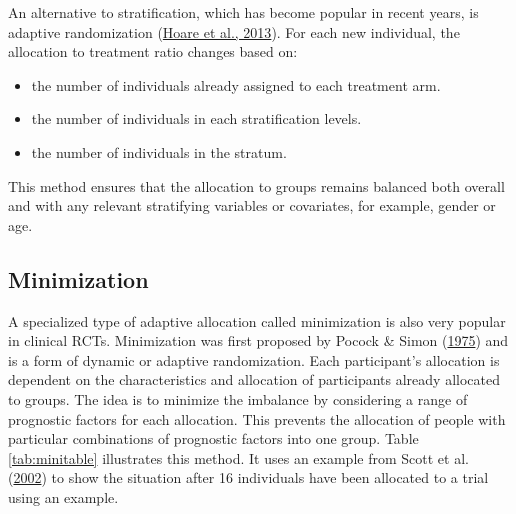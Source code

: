 \documentclass{krantz}
\providecommand{\tightlist}{%
\setlength{\itemsep}{0pt}\setlength{\parskip}{0pt}}
\begin{document}
An alternative to stratification, which has become popular in recent years, is adaptive randomization (\protect\hyperlink{ref-hoare2013}{Hoare et al., 2013}). For each new individual, the allocation to treatment ratio changes based on:

\begin{itemize}
\tightlist
\item
  the number of individuals already assigned to each treatment arm.
\item
  the number of individuals in each stratification levels.
\item
  the number of individuals in the stratum.
\end{itemize}

This method ensures that the allocation to groups remains balanced both overall and with any relevant stratifying variables or covariates, for example, gender or age.

\hypertarget{minimization}{%
\subsection{Minimization}\label{minimization}}

A specialized type of adaptive allocation called minimization is also very popular in clinical RCTs. Minimization was first proposed by Pocock \& Simon (\protect\hyperlink{ref-pocock1975}{1975}) and is a form of dynamic or adaptive randomization. Each participant's allocation is dependent on the characteristics and allocation of participants already allocated to groups. The idea is to minimize the imbalance by considering a range of prognostic factors for each allocation. This prevents the allocation of people with particular combinations of prognostic factors into one group. Table \ref{tab:minitable} illustrates this method. It uses an example from Scott et al. (\protect\hyperlink{ref-scott2002}{2002}) to show the situation after 16 individuals have been allocated to a trial using an example.
\end{document}
